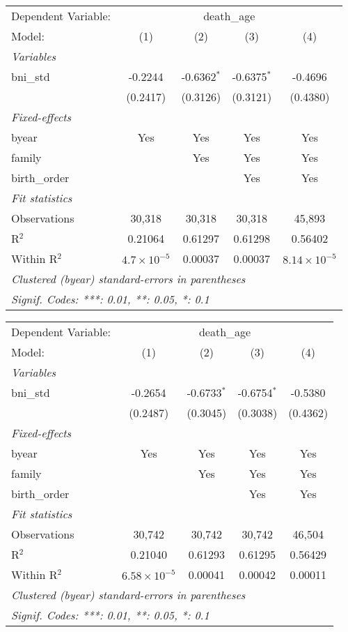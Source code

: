 \begin{tabular}{lcccc}
\tabularnewline\midrule\midrule
Dependent Variable: & \multicolumn{4}{c}{death\_age}\\
Model: & (1) & (2) & (3) & (4)\\
\midrule \emph{Variables} &   &   &   &  \\
bni\_std & -0.2244 & -0.6362$^{*}$ & -0.6375$^{*}$ & -0.4696\\
  & (0.2417) & (0.3126) & (0.3121) & (0.4380)\\
\midrule \emph{Fixed-effects} &   &   &   &  \\
byear & Yes & Yes & Yes & Yes\\
family &  & Yes & Yes & Yes\\
birth\_order &  &  & Yes & Yes\\
\midrule \emph{Fit statistics} &   &   &   &  \\
Observations & 30,318 & 30,318 & 30,318 & 45,893\\
R$^2$ & 0.21064 & 0.61297 & 0.61298 & 0.56402\\
Within R$^2$ & $4.7\times 10^{-5}$ & 0.00037 & 0.00037 & $8.14\times 10^{-5}$\\
\midrule\midrule\multicolumn{5}{l}{\emph{Clustered (byear) standard-errors in parentheses}}\\
\multicolumn{5}{l}{\emph{Signif. Codes: ***: 0.01, **: 0.05, *: 0.1}}\\
\end{tabular}



\begin{tabular}{lcccc}
\tabularnewline\midrule\midrule
Dependent Variable: & \multicolumn{4}{c}{death\_age}\\
Model: & (1) & (2) & (3) & (4)\\
\midrule \emph{Variables} &   &   &   &  \\
bni\_std & -0.2654 & -0.6733$^{*}$ & -0.6754$^{*}$ & -0.5380\\
  & (0.2487) & (0.3045) & (0.3038) & (0.4362)\\
\midrule \emph{Fixed-effects} &   &   &   &  \\
byear & Yes & Yes & Yes & Yes\\
family &  & Yes & Yes & Yes\\
birth\_order &  &  & Yes & Yes\\
\midrule \emph{Fit statistics} &   &   &   &  \\
Observations & 30,742 & 30,742 & 30,742 & 46,504\\
R$^2$ & 0.21040 & 0.61293 & 0.61295 & 0.56429\\
Within R$^2$ & $6.58\times 10^{-5}$ & 0.00041 & 0.00042 & 0.00011\\
\midrule\midrule\multicolumn{5}{l}{\emph{Clustered (byear) standard-errors in parentheses}}\\
\multicolumn{5}{l}{\emph{Signif. Codes: ***: 0.01, **: 0.05, *: 0.1}}\\
\end{tabular}



